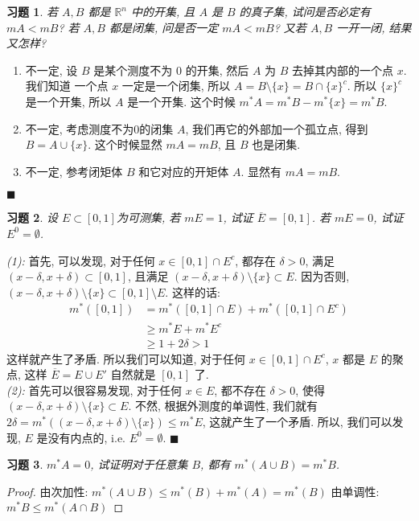 \documentclass{article}
\newtheorem{exercise}{习题}
\newenvironment{solve}{{\flushleft\textit{解.}}}{\hfill $\blacksquare$}
\begin{document}
\begin{exercise}
  若 $A, B$ 都是 $\mathbb{R}^n$ 中的开集, 且 $A$ 是 $B$ 的真子集, 试问是否必定有 $mA < mB$? 若 $A, B$ 都是闭集, 问是否一定 $mA < mB$? 又若 $A, B$ 一开一闭, 结果又怎样?
\end{exercise}
\begin{solve}
  \begin{enumerate}
  \item 不一定, 设 $B$ 是某个测度不为 $0$ 的开集, 然后 $A$ 为 $B$ 去掉其内部的一个点 $x$. 我们知道 一个点 $x$ 一定是一个闭集, 所以 $A = B\setminus \{x\} = B\cap \{x\}^c$.
    所以 $\{x\}^c$ 是一个开集, 所以 $A$ 是一个开集. 这个时候 $m^* A = m^* B - m^*\{x\} = m^*B$.
  \item 不一定, 考虑测度不为0的闭集 $A$, 我们再它的外部加一个孤立点, 得到 $B = A\cup \{x\}$. 这个时候显然 $mA = mB$, 且 $B$ 也是闭集.
  \item 不一定, 参考闭矩体 $B$ 和它对应的开矩体 $A$. 显然有 $mA = mB$.
  \end{enumerate}
\end{solve}
\begin{exercise}
  设 $E\subset [0, 1]$为可测集, 若 $mE = 1$, 试证 $\overline{E} = [0, 1]$.
  若 $mE = 0$, 试证 $E^0 = \emptyset$.
\end{exercise}
\begin{solve}
  \emph{(1):} 首先, 可以发现, 对于任何 $x\in [0, 1]\cap E^c$, 都存在 $\delta > 0$, 满足 $(x - \delta, x + \delta) \subset [0, 1]$, 且满足 $(x - \delta, x + \delta) \setminus \{x\} \subset E$. 因为否则, $(x - \delta, x + \delta) \setminus \{x\} \subset [0, 1] \setminus E$. 这样的话:
  \begin{align*}
  m^*([0, 1]) &= m^*([0,1]\cap E) + m^*([0, 1] \cap E^c) \\
              &\geq m^*E + m^*E^c \\
    &\geq 1 + 2\delta > 1
  \end{align*}
  这样就产生了矛盾. 所以我们可以知道, 对于任何 $x\in [0, 1]\cap E^c$, $x$ 都是 $E$ 的聚点, 这样 $\overline{E} = E\cup E'$ 自然就是 $[0, 1]$ 了. \\
  \emph{(2):} 首先可以很容易发现, 对于任何 $x \in E$, 都不存在 $\delta > 0$, 使得 $(x - \delta, x + \delta)\setminus \{x\} \subset E$. 不然, 根据外测度的单调性, 我们就有 $2\delta = m^*((x - \delta, x + \delta)\setminus\{x\}) \leq m^*E$, 这就产生了一个矛盾.
  所以, 我们可以发现, $E$ 是没有内点的, i.e. $E^0 = \emptyset$.
\end{solve}

\begin{exercise}
  $m^*A = 0$, 试证明对于任意集 $B$, 都有 $m^*(A\cup B) = m^*B$.
\end{exercise}
\begin{proof}
  由次加性: $m^*(A\cup B) \leq m^*(B) + m^*(A) = m^*(B)$
  由单调性: $ m^*B \leq m^*(A\cap B)$
\end{proof}
\end{document}
